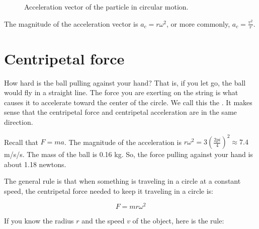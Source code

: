 \begin{figure}[htbp]
    \begin{center}
        
    \end{center}
    \caption{Acceleration vector of the particle in circular motion.}
    \label{fig:billardBallAcceleration}
\end{figure}

The magnitude of the acceleration vector is $a_c =r \omega^2$, or more commonly, $a_c = \frac{v^2}{r}$.

\section{Centripetal force}

How hard is the ball pulling against your hand? That is, if you let go, the ball would fly in a straight line.  
The force you are exerting on the string is what causes it to accelerate toward the center of the
circle. We call this the . It makes sense that the centripetal force and centripetal acceleration are in the same direction. 

Recall that $F = m a$.  The magnitude of the acceleration is $r
\omega^2 = 3 \left(\frac{2 pi}{4}\right)^2 \approx 7.4$ m/s/s.  The mass
of the ball is 0.16 kg.  So, the force pulling against your hand is
about 1.18 newtons.

The general rule is that when something is traveling in a circle at a
constant speed, the centripetal force needed to keep it traveling in a
circle is:

$$F = m r \omega^2$$

If you know the radius $r$ and the speed $v$ of the object, here is the rule:

